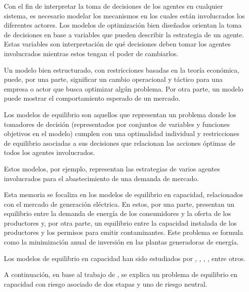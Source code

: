 Con el fin de interpretar la toma de decisiones de los agentes en cualquier sistema, es necesario modelar los mecanismos en los cuales están involucrados los diferentes actores. Los modelos de optimización bien diseñados orientan la toma de decisiones en base a variables que pueden describir la estrategia de un agente. Estas variables son interpretación de qué decisiones deben tomar los agentes involucrados mientras estos tengan el poder de cambiarlos. 
\vspace{2.5mm}

Un modelo bien estructurado, con restricciones basadas en la teoría económica, puede, por una parte, significar un cambio operacional y táctico para una empresa o actor que busca optimizar algún problema. Por otra parte, un modelo puede mostrar el comportamiento esperado de un mercado.
\vspace{2.5mm}

Los modelos de equilibrio son aquellos que representan un problema donde los tomadores de decisión (representados por conjuntos de variables y funciones objetivos en el modelo) cumplen con una optimalidad individual y restricciones de equilibrio asociadas a sus decisiones que relacionan las acciones óptimas de todos los agentes involucrados.
\vspace{2.5mm}

Estos modelos, por ejemplo, representan las estrategias de varios agentes involucrados para el abastecimiento de una demanda de mercado. 
\vspace{2.5mm}

Esta memoria se focaliza en los modelos de equilibrio en capacidad, relacionados con el mercado de generación eléctrica. En estos, por una parte, presentan un equilibrio entre la demanda de energía de los consumidores y la oferta de los productores y, por otra parte, un equilibrio entre la capacidad instalada de los productores y los permisos para emitir contaminantes. Este problema se formula como la minimización anual de inversión en las plantas generadoras de energía.
\vspace{2.5mm}

Los modelos de equilibrio en capacidad han sido estudiados por , , , , entre otros.
\vspace{2.5mm}

A continuación, en base al trabajo de , se explica un problema de equilibrio en capacidad con riesgo asociado de dos etapas y uno de riesgo neutral.


